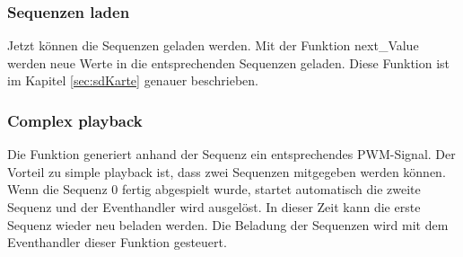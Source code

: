 \subsubsection*{Sequenzen laden}\label{sec:Sequenzen befüllen}
Jetzt können die Sequenzen geladen werden. Mit der Funktion next\_Value werden neue Werte in die entsprechenden Sequenzen geladen. Diese Funktion ist im Kapitel \ref{sec:sdKarte} genauer beschrieben.

\subsubsection*{Complex playback}\label{sec:Complex playback}
Die Funktion generiert anhand der Sequenz ein entsprechendes PWM-Signal. Der
Vorteil zu simple playback ist, dass zwei Sequenzen mitgegeben werden können. Wenn die Sequenz 0 fertig abgespielt wurde, startet automatisch die zweite Sequenz und der Eventhandler wird ausgelöst. In dieser Zeit kann die erste Sequenz wieder neu beladen werden. Die Beladung der Sequenzen wird mit dem Eventhandler dieser Funktion gesteuert. 
